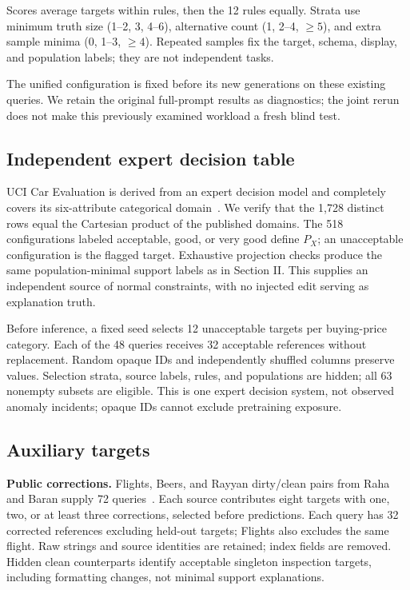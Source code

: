 \documentclass[conference]{IEEEtran}
\begin{document}
Scores average targets within rules, then the 12 rules equally. Strata use minimum truth size (1--2, 3, 4--6), alternative count (1, 2--4, $\geq5$), and extra sample minima (0, 1--3, $\geq4$). Repeated samples fix the target, schema, display, and population labels; they are not independent tasks.


The unified configuration is fixed before its new generations on these existing queries. We retain the original full-prompt results as diagnostics; the joint rerun does not make this previously examined workload a fresh blind test.

\subsection{Independent expert decision table}
UCI Car Evaluation is derived from an expert decision model and completely covers its six-attribute categorical domain~\cite{bohanec1988car}. We verify that the 1,728 distinct rows equal the Cartesian product of the published domains. The 518 configurations labeled acceptable, good, or very good define $P_X$; an unacceptable configuration is the flagged target. Exhaustive projection checks produce the same population-minimal support labels as in Section II. This supplies an independent source of normal constraints, with no injected edit serving as explanation truth.

Before inference, a fixed seed selects 12 unacceptable targets per buying-price category. Each of the 48 queries receives 32 acceptable references without replacement. Random opaque IDs and independently shuffled columns preserve values. Selection strata, source labels, rules, and populations are hidden; all 63 nonempty subsets are eligible. This is one expert decision system, not observed anomaly incidents; opaque IDs cannot exclude pretraining exposure.

\subsection{Auxiliary targets}
\textbf{Public corrections.} Flights, Beers, and Rayyan dirty/clean pairs from Raha and Baran supply 72 queries~\cite{mahdavi2019raha,mahdavi2020baran}. Each source contributes eight targets with one, two, or at least three corrections, selected before predictions. Each query has 32 corrected references excluding held-out targets; Flights also excludes the same flight. Raw strings and source identities are retained; index fields are removed. Hidden clean counterparts identify acceptable singleton inspection targets, including formatting changes, not minimal support explanations.
\end{document}
